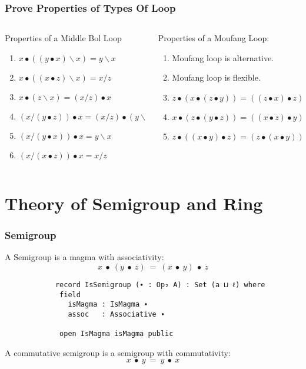 \documentclass[xcolor={dvipsnames}]{beamer}
\begin{document}

  \begin{frame}[fragile]
    \frametitle{Prove Properties of Types Of Loop}  
    \begin{columns}
      \begin{column}{0.4\textwidth}
        Properties of a Middle Bol Loop
        \begin{enumerate}
        \item \(x∙((y∙x)\backslash x)=y\backslash x\) 
        \item \(x∙((x∙z)\backslash x)=x/z\)
        \item \(x∙ (z\backslash x)=(x/z)∙x\)
        \item \((x/(y∙z))∙x=(x/z)∙(y\backslash x)\)
        \item \((x/(y∙x))∙x=y\backslash x\)
        \item \((x/(x∙z))∙x= x/ z\)
        \end{enumerate}
      \end{column}
      \hfill
      \begin{column}{0.575\textwidth}
        Properties of a Moufang Loop:
        \begin{enumerate}
        \item Moufang loop is alternative.
        \item Moufang loop is flexible.
        \item $z∙(x∙(z∙y))=((z∙x)∙z)∙y$
        \item $x∙(z∙(y∙z))=((x∙z)∙y)∙z$ 
        \item $z∙((x∙y)∙z)=(z∙ (x∙y))∙z$ 
        \end{enumerate}
      \end{column}
    \end{columns}
  \end{frame}

\section{Theory of Semigroup and Ring}

\begin{frame}[fragile]
    \frametitle{Semigroup} 
     A Semigroup is a magma with associativity: 
     \[x\ ∙\ (y\ ∙\ z)\ =\ (x\ ∙\ y)\ ∙\ z\]  
        \begin{verbatim}
            record IsSemigroup (∙ : Op₂ A) : Set (a ⊔ ℓ) where
             field
               isMagma : IsMagma ∙
               assoc   : Associative ∙
            
             open IsMagma isMagma public
          \end{verbatim}
        A commutative semigroup is a semigroup with commutativity:
        \[x\ ∙\ y\ =\ y\ ∙\ x\]
  \end{frame}
\end{document}
